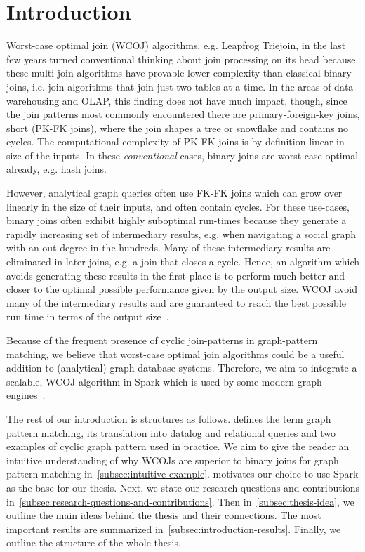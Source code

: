\section{Introduction} \label{sec:introduction}
Worst-case optimal join (WCOJ) algorithms, e.g. Leapfrog Triejoin, in the last few years turned conventional thinking about join processing
on its head because these multi-join algorithms have provable lower complexity than classical binary joins,
i.e. join algorithms that join just two tables at-a-time.
In the areas of data warehousing and OLAP, this finding does not have much impact, though,
since the join patterns most commonly encountered there are primary-foreign-key joins, short (PK-FK joins),
where the join shapes a tree or snowflake and contains no cycles.
The computational complexity of PK-FK joins is by definition linear in size of the inputs.
In these \textit{conventional} cases, binary joins are worst-case optimal already, e.g. hash joins.

However, analytical graph queries often use FK-FK joins which can grow over linearly in the size of their inputs,
and often contain cycles.
For these use-cases, binary joins often exhibit highly suboptimal run-times because they generate a rapidly increasing set of
intermediary results, e.g. when navigating a social graph with an out-degree in the hundreds.
Many of these intermediary results are eliminated in later joins, e.g. a join that closes a cycle.
Hence, an algorithm which avoids generating these results in the first place is to perform much better and
closer to the optimal possible performance given by the output size.
\textsc{WCOJ} avoid many of the intermediary results and are guaranteed to reach the best possible run time in terms of
the output size~\cite{agm}.

Because of the frequent presence of cyclic join-patterns in graph-pattern matching, we believe that worst-case optimal join algorithms
could be a useful addition to (analytical) graph database systems.
Therefore, we aim to integrate a scalable, \textsc{WCOJ} algorithm in Spark which is used by some modern graph engines~\cite{caps,gcore,
graphframe}.

The rest of our introduction is structures as follows.
 defines the term graph pattern matching, its translation into datalog and
relational queries and two examples of cyclic graph pattern used in practice.
We aim to give the reader an intuitive understanding of why \textsc{WCOJ}s are superior to binary joins for graph pattern matching
in~\cref{subsec:intuitive-example}.
 motivates our choice to use Spark as the base for our thesis.
Next, we state our research questions and contributions in~\cref{subsec:research-questions-and-contributions}.
Then in~\cref{subsec:thesis-idea}, we outline the main ideas behind the thesis and their connections.
The most important results are summarized in~\cref{subsec:introduction-results}.
Finally, we outline the structure of the whole thesis.


